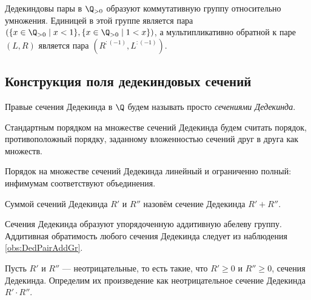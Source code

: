 \documentclass[
	extrafontsizes,
	11pt,
	hyphens,
]{memoir}
\begin{document}
\begin{observation}
\label{obs:DedPairMultGr}
Дедекиндовы пары в \(\Q_{>0}\) образуют коммутативную группу относительно умножения.
Единицей в этой группе является пара
\((\{x \in \Q_{>0} \mid x < 1\}, \{x \in \Q_{>0} \mid 1 < x\})\),
а мультипликативно обратной к паре \((L,R)\) является пара \((R^{:(-1)}, L^{:(-1)})\).
\end{observation}

\subsection{Конструкция поля дедекиндовых сечений}

\begin{definition}
Правые сечения Дедекинда в \(\Q\) будем называть просто \emph{сечениями Дедекинда}.
\end{definition}

\begin{definition}
Стандартным порядком на множестве сечений Дедекинда будем считать порядок, противоположный порядку, заданному вложенностью сечений друг в друга как множеств.
\end{definition}

\begin{observation}
Порядок на множестве сечений Дедекинда линейный и ограниченно полный: инфимумам соответствуют объединения.
\end{observation}

\begin{definition}
Суммой сечений Дедекинда \(R'\) и \(R''\) назовём сечение Дедекинда \(R' + R''\).
\end{definition}

\begin{observation}
Сечения Дедекинда образуют упорядоченную аддитивную абелеву группу. Аддитивная обратимость любого сечения Дедекинда следует из наблюдения \ref{obs:DedPairAddGr}.
\end{observation}

\begin{definition}
Пусть \(R'\) и \(R''\) --- неотрицательные, то есть такие, что \(R' \geq 0\) и \(R'' \geq 0\), сечения Дедекинда.
Определим их произведение как неотрицательное сечение Дедекинда
\(R' \cdot R''\).
\end{definition}
\end{document}
